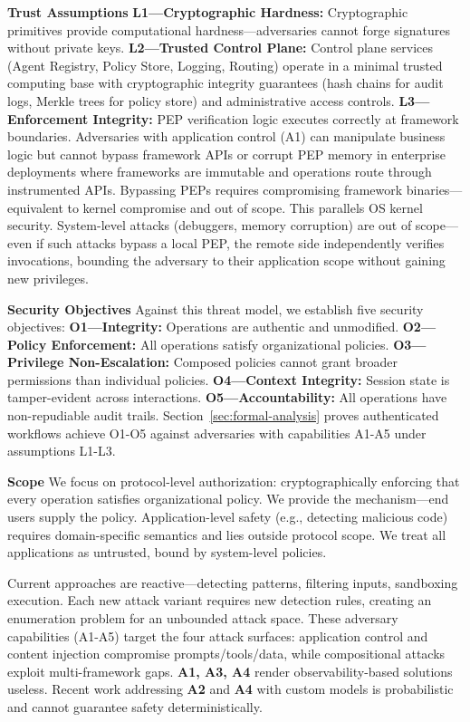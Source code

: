 \textbf{Trust Assumptions} \textbf{L1—Cryptographic Hardness:} Cryptographic primitives provide computational hardness—adversaries cannot forge signatures without private keys. \textbf{L2—Trusted Control Plane:} Control plane services (Agent Registry, Policy Store, Logging, Routing) operate in a minimal trusted computing base with cryptographic integrity guarantees (hash chains for audit logs, Merkle trees for policy store) and administrative access controls. \textbf{L3—Enforcement Integrity:} PEP verification logic executes correctly at framework boundaries. Adversaries with application control (A1) can manipulate business logic but cannot bypass framework APIs or corrupt PEP memory in enterprise deployments where frameworks are immutable and operations route through instrumented APIs. Bypassing PEPs requires compromising framework binaries—equivalent to kernel compromise and out of scope. This parallels OS kernel security. System-level attacks (debuggers, memory corruption) are out of scope—even if such attacks bypass a local PEP, the remote side independently verifies invocations, bounding the adversary to their application scope without gaining new privileges.

\textbf{Security Objectives} Against this threat model, we establish five security objectives: \textbf{O1—Integrity:} Operations are authentic and unmodified. \textbf{O2—Policy Enforcement:} All operations satisfy organizational policies. \textbf{O3—Privilege Non-Escalation:} Composed policies cannot grant broader permissions than individual policies. \textbf{O4—Context Integrity:} Session state is tamper-evident across interactions. \textbf{O5—Accountability:} All operations have non-repudiable audit trails. Section~\ref{sec:formal-analysis} proves authenticated workflows achieve O1-O5 against adversaries with capabilities A1-A5 under assumptions L1-L3.

\textbf{Scope} We focus on protocol-level authorization: cryptographically enforcing that every operation satisfies organizational policy. We provide the mechanism—end users supply the policy.
Application-level safety (e.g., detecting malicious code) requires domain-specific semantics and lies outside protocol scope. We treat all applications as untrusted, bound by system-level policies.

Current approaches are reactive—detecting patterns, filtering inputs, sandboxing execution. Each new attack variant requires new detection rules, creating an enumeration problem for an unbounded attack space. These adversary capabilities (A1-A5) target the four attack surfaces: application control and content injection compromise prompts/tools/data, while compositional attacks exploit multi-framework gaps. \textbf{A1, A3, A4} render observability-based solutions useless. Recent work addressing \textbf{A2} and \textbf{A4} with custom models \cite{camel2023} is probabilistic and cannot guarantee safety deterministically.

